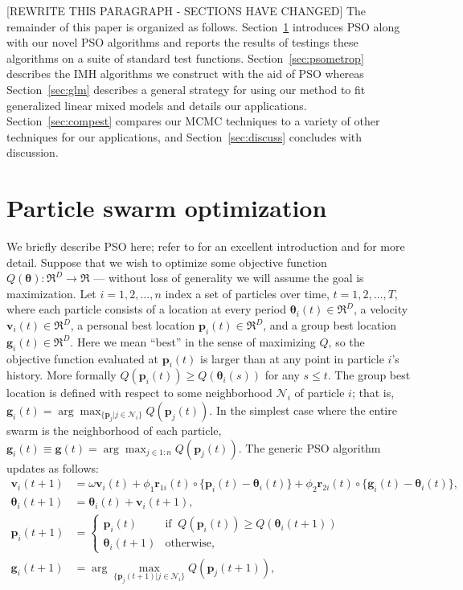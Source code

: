 \documentclass[12pt]{article}
\begin{document}
[REWRITE THIS PARAGRAPH - SECTIONS HAVE CHANGED]
The remainder of this paper is organized as follows. Section~\ref{sec:pso} introduces PSO along with our novel PSO algorithms and reports the results of testings these algorithms on a suite of standard test functions. Section~\ref{sec:psometrop} describes the IMH algorithms we construct with the aid of PSO whereas Section~\ref{sec:glm} describes a general strategy for using our method to fit generalized linear mixed models and details our applications. Section~\ref{sec:compest} compares our MCMC techniques to a variety of other techniques for our applications, and Section~\ref{sec:discuss} concludes with discussion. 



\section{Particle swarm optimization}\label{sec:pso}
We briefly describe PSO here; refer to \citet{blum2008swarm} for an excellent introduction and \citet{clerc2010particle} for more detail. Suppose that we wish to optimize some objective function $Q(\bm{\theta}):\Re^D\to\Re$ --- without loss of generality we will assume the goal is maximization. Let $i=1,2,\dots,n$ index a set of particles over time, $t=1,2,\dots,T$, where each particle consists of a location at every period $\bm{\theta}_i(t)\in \Re^D$, a velocity $\bm{v}_i(t) \in \Re^D$, a personal best location $\bm{p}_i(t)\in\Re^D$, and a group best location $\bm{g}_i(t)\in\Re^D$. Here we mean ``best'' in the sense of maximizing $Q$, so the objective function evaluated at $\bm{p}_i(t)$ is larger than at any point in particle $i$'s history. More formally $Q(\bm{p}_i(t)) \geq Q(\bm{\theta}_i(s))$ for any $s\leq t$. The group best location is defined with respect to some neighborhood $\mathcal{N}_i$ of particle $i$; that is, $\bm{g}_i(t) = \arg\max_{\{\bm{p}_j|j\in\mathcal{N}_i\}}Q(\bm{p}_j(t))$. In the simplest case where the entire swarm is the neighborhood of each particle, $\bm{g}_i(t)\equiv \bm{g}(t) = \arg\max_{j\in 1:n}Q(\bm{p}_j(t))$. The generic PSO algorithm updates as follows:
\begin{align}\label{eq:pso}
\bm{v}_i(t+1) &= \omega \bm{v}_i(t) + \phi_1 \bm{r}_{1i}(t)\circ\{\bm{p}_i(t) - \bm{\theta}_i(t)\} + \phi_2 \bm{r}_{2i}(t)\circ\{\bm{g}_i(t) - \bm{\theta}_i(t)\},\nonumber\\
\bm{\theta}_i(t+1) &= \bm{\theta}_i(t) + \bm{v}_i(t+1),\nonumber\\
\bm{p}_i(t+1) &= \begin{cases} \bm{p}_i(t)   & \mbox{if }\  Q(\bm{p}_i(t)) \ge Q(\bm{\theta}_i(t + 1))\\
                               \bm{\theta}_i(t+1) & \mbox{otherwise},
\end{cases}\nonumber\\
\bm{g}_i(t+1) &= \arg\max_{\{\bm{p}_j(t+1)|j\in\mathcal{N}_i\}}Q(\bm{p}_j(t+1)),
\end{align}
\end{document}
